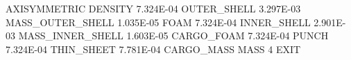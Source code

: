 AXISYMMETRIC
DENSITY
7.324E-04  OUTER_SHELL
3.297E-03  MASS_OUTER_SHELL
1.035E-05  FOAM
7.324E-04  INNER_SHELL
2.901E-03  MASS_INNER_SHELL
1.603E-05  CARGO_FOAM
7.324E-04  PUNCH
7.324E-04  THIN_SHEET
7.781E-04  CARGO_MASS
MASS 4
EXIT
